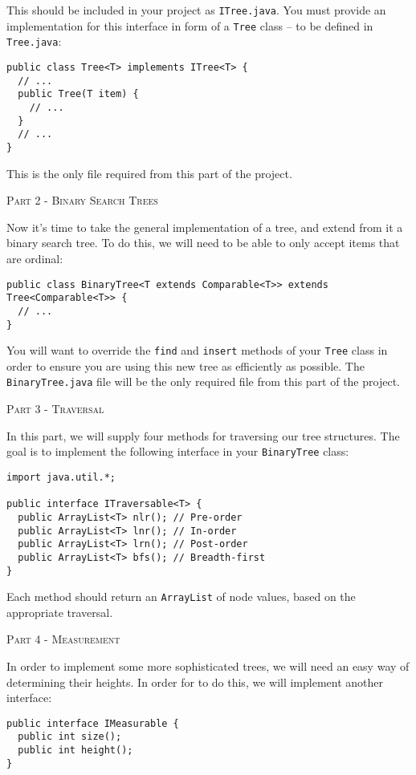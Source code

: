 \documentclass{letter}
\newcommand{\heading}[1]{{\large \textsc{#1}}}
\begin{document}
This should be included in your project as \texttt{ITree.java}.  You must
provide an implementation for this interface in form of a \texttt{Tree} class
-- to be defined in \texttt{Tree.java}:

\begin{verbatim}
public class Tree<T> implements ITree<T> {
  // ...
  public Tree(T item) {
    // ...
  }
  // ...
}
\end{verbatim}

This is the only file required from this part of the project.

\heading{Part 2 - Binary Search Trees}

Now it's time to take the general implementation of a tree, and extend from it
a binary search tree.  To do this, we will need to be able to only accept items
that are ordinal:

\begin{verbatim}
public class BinaryTree<T extends Comparable<T>> extends Tree<Comparable<T>> {
  // ...
}
\end{verbatim}

You will want to override the \texttt{find} and \texttt{insert} methods of your
\texttt{Tree} class in order to ensure you are using this new tree as
efficiently as possible.  The \texttt{BinaryTree.java} file will be the
only required file from this part of the project.

\heading{Part 3 - Traversal}

In this part, we will supply four methods for traversing our tree structures.
The goal is to implement the following interface in your \texttt{BinaryTree}
class:

\begin{verbatim}
import java.util.*;

public interface ITraversable<T> {
  public ArrayList<T> nlr(); // Pre-order
  public ArrayList<T> lnr(); // In-order
  public ArrayList<T> lrn(); // Post-order
  public ArrayList<T> bfs(); // Breadth-first
}
\end{verbatim}

Each method should return an \texttt{ArrayList} of node values, based on the
appropriate traversal.

\heading{Part 4 - Measurement}

In order to implement some more sophisticated trees, we will need an easy way
of determining their heights.  In order for to do this, we will implement
another interface:

\begin{verbatim}
public interface IMeasurable {
  public int size();
  public int height();
}
\end{verbatim}
\end{document}
